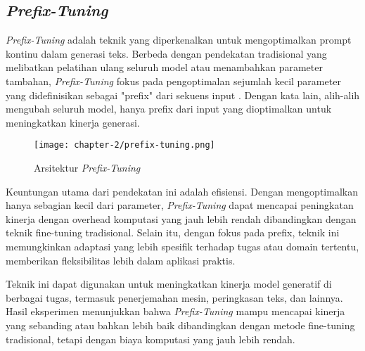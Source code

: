 \subsection{\textit{Prefix-Tuning}}

\textit{Prefix-Tuning} adalah teknik yang diperkenalkan untuk mengoptimalkan prompt kontinu dalam generasi teks. Berbeda dengan pendekatan tradisional yang melibatkan pelatihan ulang seluruh model atau menambahkan parameter tambahan, \textit{Prefix-Tuning} fokus pada pengoptimalan sejumlah kecil parameter yang didefinisikan sebagai "prefix" dari sekuens input \parencite{prefix_tuning}. Dengan kata lain, alih-alih mengubah seluruh model, hanya prefix dari input yang dioptimalkan untuk meningkatkan kinerja generasi.

\begin{figure}[ht]
    \centering
    \texttt{[image: chapter-2/prefix-tuning.png]}
    \caption{Arsitektur \textit{Prefix-Tuning}}
    \label{fig:prefix-tuning}
\end{figure}

Keuntungan utama dari pendekatan ini adalah efisiensi. Dengan mengoptimalkan hanya sebagian kecil dari parameter, \textit{Prefix-Tuning} dapat mencapai peningkatan kinerja dengan overhead komputasi yang jauh lebih rendah dibandingkan dengan teknik fine-tuning tradisional. Selain itu, dengan fokus pada prefix, teknik ini memungkinkan adaptasi yang lebih spesifik terhadap tugas atau domain tertentu, memberikan fleksibilitas lebih dalam aplikasi praktis.

Teknik ini dapat digunakan untuk meningkatkan kinerja model generatif di berbagai tugas, termasuk penerjemahan mesin, peringkasan teks, dan lainnya. Hasil eksperimen menunjukkan bahwa \textit{Prefix-Tuning} mampu mencapai kinerja yang sebanding atau bahkan lebih baik dibandingkan dengan metode fine-tuning tradisional, tetapi dengan biaya komputasi yang jauh lebih rendah.

